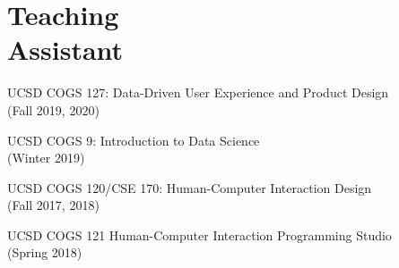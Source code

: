 \section{Teaching\\Assistant}

\begin{innerlist}
\item UCSD COGS 127: Data-Driven User Experience and Product Design  \\ (Fall 2019, 2020)
\item UCSD COGS 9: Introduction to Data Science  \\ (Winter 2019)
\item UCSD COGS 120/CSE 170: Human-Computer Interaction Design \\ (Fall 2017, 2018)
\item UCSD COGS 121 Human-Computer Interaction Programming Studio \\ (Spring 2018)
\end{innerlist}

